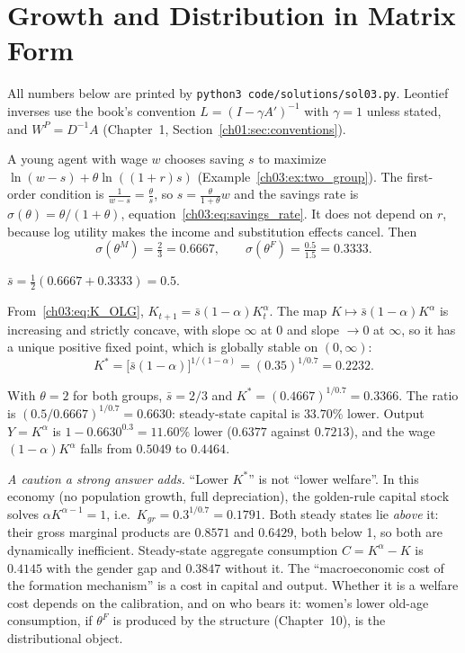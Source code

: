 \documentclass[../solutions_manual.tex]{subfiles}
\begin{document}
\ifSubfilesClassLoaded{\setcounter{chapter}{2}}{}%
\setcounter{chapter}{2}%
\chapter{Growth and Distribution in Matrix Form}\label{sol03}
\sloppy

All numbers below are printed by \texttt{python3 code/solutions/sol03.py}. Leontief inverses use the book's convention $L = (I - \gamma A')^{-1}$ with $\gamma = 1$ unless stated, and $W^P = D^{-1}A$ (Chapter~1, Section~\ref{ch01:sec:conventions}).


 A young agent with wage $w$ chooses saving $s$ to maximize $\ln(w - s) + \theta\ln((1 + r)s)$ (Example~\ref{ch03:ex:two_group}). The first-order condition is $\frac{1}{w - s} = \frac{\theta}{s}$, so $s = \frac{\theta}{1+\theta}w$ and the savings rate is $\sigma(\theta) = \theta/(1+\theta)$, equation~\eqref{ch03:eq:savings_rate}. It does not depend on $r$, because log utility makes the income and substitution effects cancel. Then
\[
\sigma(\theta^M) = \tfrac{2}{3} = 0.6667, \qquad \sigma(\theta^F) = \tfrac{0.5}{1.5} = 0.3333 .
\]

 $\bar s = \frac12(0.6667 + 0.3333) = 0.5$.

 From~\eqref{ch03:eq:K_OLG}, $K_{t+1} = \bar s(1-\alpha)K_t^\alpha$. The map $K \mapsto \bar s(1-\alpha)K^\alpha$ is increasing and strictly concave, with slope $\infty$ at 0 and slope $\to 0$ at $\infty$, so it has a unique positive fixed point, which is globally stable on $(0,\infty)$:
\[
K^* = \bigl[\bar s(1-\alpha)\bigr]^{1/(1-\alpha)} = (0.35)^{1/0.7} = 0.2232 .
\]

 With $\theta = 2$ for both groups, $\bar s = 2/3$ and $K^* = (0.4667)^{1/0.7} = 0.3366$. The ratio is $(0.5/0.6667)^{1/0.7} = 0.6630$: steady-state capital is $33.70\%$ lower. Output $Y = K^\alpha$ is $1 - 0.6630^{0.3} = 11.60\%$ lower ($0.6377$ against $0.7213$), and the wage $(1-\alpha)K^\alpha$ falls from $0.5049$ to $0.4464$.

\emph{A caution a strong answer adds.} ``Lower $K^*$'' is not ``lower welfare''. In this economy (no population growth, full depreciation), the golden-rule capital stock solves $\alpha K^{\alpha-1} = 1$, i.e.\ $K_{gr} = 0.3^{1/0.7} = 0.1791$. Both steady states lie \emph{above} it: their gross marginal products are $0.8571$ and $0.6429$, both below 1, so both are dynamically inefficient. Steady-state aggregate consumption $C = K^\alpha - K$ is $0.4145$ with the gender gap and $0.3847$ without it. The ``macroeconomic cost of the formation mechanism'' is a cost in capital and output. Whether it is a welfare cost depends on the calibration, and on who bears it: women's lower old-age consumption, if $\theta^F$ is produced by the structure (Chapter~10), is the distributional object.
\end{document}
